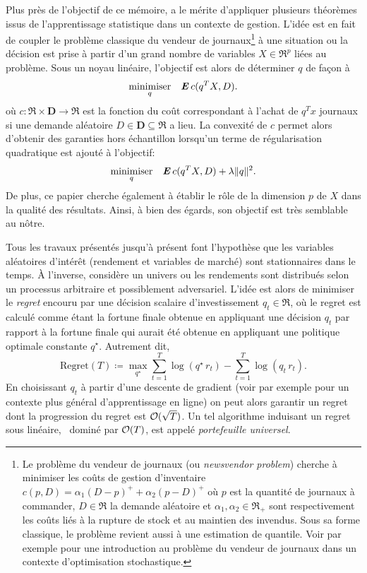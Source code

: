 Plus près de l'objectif de ce mémoire, \cite{rudin2014big} a le mérite d'appliquer
plusieurs théorèmes issus de l'apprentissage statistique dans un contexte de
gestion. L'idée est en fait de coupler le problème classique du vendeur de
journaux\footnote{Le problème du vendeur de journaux (ou \textsl{newsvendor problem})
  cherche à minimiser les coûts de gestion d'inventaire
  $c(p,D) = \alpha_1(D-p)^+ + \alpha_2(p-D)^+$ où $p$ est la quantité de journaux à commander,
  $D \in \Re$ la demande aléatoire et $\alpha_1,\alpha_2 \in \Re_+$ sont respectivement les coûts liés à la
  rupture de stock et au maintien des invendus. Sous sa forme classique, le problème
  revient aussi à une estimation de quantile. Voir par exemple \cite{shapiro2009lectures}
  pour une introduction au problème du vendeur de journaux dans un contexte d'optimisation
  stochastique.} à une situation ou la décision est prise à partir d'un grand nombre de
variables $X \in \Re^p$ liées au problème. Sous un noyau linéaire, l'objectif est alors de
déterminer $q$ de façon à
\begin{equation}
  \minimizeEquation[q]{\E c(q^TX,D).}
\end{equation}
où $c:\Re\times\bm{D}\to\Re$ est la fonction du coût correspondant à l'achat de $q^Tx$ journaux si
une demande aléatoire $D \in \bm{D} \subseteq \Re$ a lieu. La convexité de $c$ permet alors d'obtenir
des garanties hors échantillon lorsqu'un terme de régularisation quadratique est ajouté à
l'objectif:
\begin{equation}
  \minimizeEquation[q]{\E c(q^TX,D) + \lambda\|q\|^2.}
\end{equation}
De plus, ce papier cherche également à établir le rôle de la dimension $p$ de $X$ dans la
qualité des résultats. Ainsi, à bien des égards, son objectif est très semblable au nôtre.

Tous les travaux présentés jusqu'à présent font l'hypothèse que les variables aléatoires
d'intérêt (rendement et variables de marché) sont stationnaires dans le temps. À
l'inverse, \cite{cover1991universal} considère un univers ou les rendements sont
distribués selon un processus arbitraire et possiblement adversariel. L'idée est alors de
minimiser le \textit{regret} encouru par une décision scalaire d'investissement
$q_t \in \Re$, où le regret est calculé comme étant la fortune finale obtenue en appliquant
une décision $q_t$ par rapport à la fortune finale qui aurait été obtenue en
appliquant une politique optimale constante $q^\star$. Autrement dit,
\begin{equation}
  \text{Regret}(T) \coloneqq \max_{q^\star}\sum_{t=1}^T \log(q^\star\,r_t) - \sum_{t=1}^T \log(q_t\,r_t).
\end{equation}
En choisissant $q_t$ à partir d'une descente de gradient (voir par exemple
\cite{hazan2015online} pour un contexte plus général d'apprentissage en ligne) on peut
alors garantir un regret dont la progression du regret est $\bigO(\sqrt{T})$. Un
tel algorithme induisant un regret sous linéaire, \ie\ dominé par $\bigO(T)$, est appelé
\textit{portefeuille universel}.

